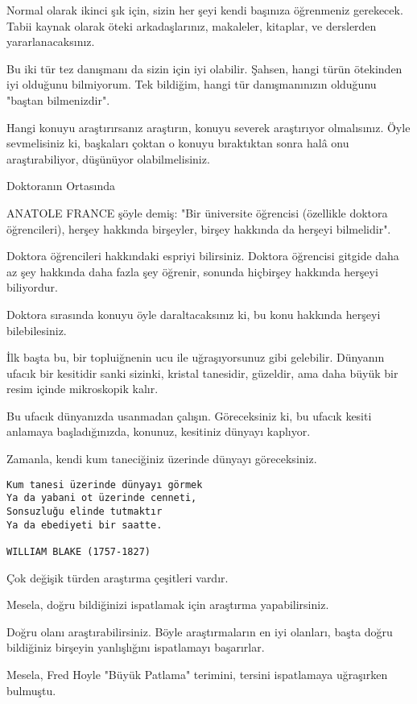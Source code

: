 \documentclass[12pt,fleqn]{article}\usepackage{../../common}
\begin{document}
Normal olarak ikinci şık için, sizin her şeyi kendi başınıza öğrenmeniz
gerekecek. Tabii kaynak olarak öteki arkadaşlarınız, makaleler, kitaplar,
ve derslerden yararlanacaksınız.

Bu iki tür tez danışmanı da sizin için iyi olabilir. Şahsen, hangi türün
ötekinden iyi olduğunu bilmiyorum. Tek bildiğim, hangi tür danışmanınızın
olduğunu "baştan bilmenizdir".

Hangi konuyu araştırırsanız araştırın, konuyu severek araştırıyor
olmalısınız. Öyle sevmelisiniz ki, başkaları çoktan o konuyu bıraktıktan
sonra halâ onu araştırabiliyor, düşünüyor olabilmelisiniz.

Doktoranın Ortasında

ANATOLE FRANCE şöyle demiş: "Bir üniversite öğrencisi (özellikle doktora
öğrencileri), herşey hakkında birşeyler, birşey hakkında da herşeyi
bilmelidir".

Doktora öğrencileri hakkındaki espriyi bilirsiniz. Doktora öğrencisi
gitgide daha az şey hakkında daha fazla şey öğrenir, sonunda hiçbirşey
hakkında herşeyi biliyordur.

Doktora sırasında konuyu öyle daraltacaksınız ki, bu konu hakkında herşeyi
bilebilesiniz.

İlk başta bu, bir topluiğnenin ucu ile uğraşıyorsunuz gibi
gelebilir. Dünyanın ufacık bir kesitidir sanki sizinki, kristal tanesidir,
güzeldir, ama daha büyük bir resim içinde mikroskopik kalır.

Bu ufacık dünyanızda usanmadan çalışın. Göreceksiniz ki, bu ufacık kesiti
anlamaya başladığınızda, konunuz, kesitiniz dünyayı kaplıyor.

Zamanla, kendi kum taneciğiniz üzerinde dünyayı göreceksiniz.

\begin{verbatim}
Kum tanesi üzerinde dünyayı görmek
Ya da yabani ot üzerinde cenneti,
Sonsuzluğu elinde tutmaktır
Ya da ebediyeti bir saatte.

WILLIAM BLAKE (1757-1827)
\end{verbatim}

Çok değişik türden araştırma çeşitleri vardır.

Mesela, doğru bildiğinizi ispatlamak için araştırma yapabilirsiniz.

Doğru olanı araştırabilirsiniz. Böyle araştırmaların en iyi olanları, başta
doğru bildiğiniz birşeyin yanlışlığını ispatlamayı başarırlar.

Mesela, Fred Hoyle "Büyük Patlama" terimini, tersini ispatlamaya uğraşırken
bulmuştu.
\end{document}
